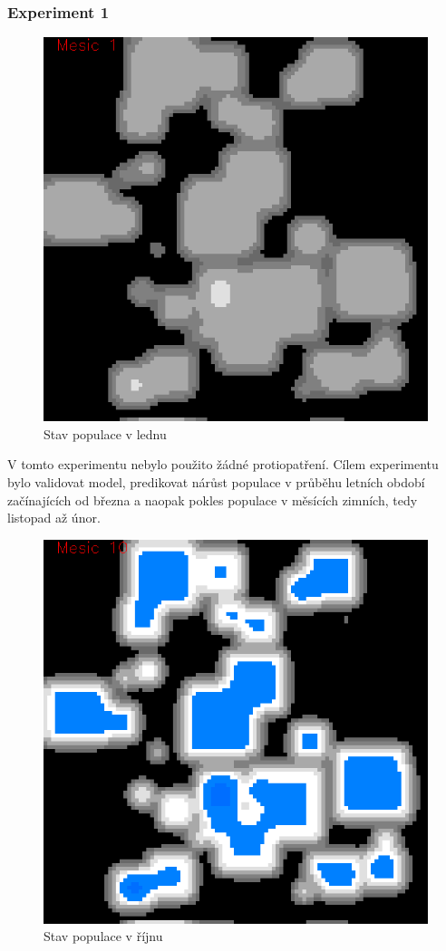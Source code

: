 \documentclass[a4paper,11pt]{article}
\begin{document}
\newpage
\subsubsection{Experiment 1}
\begin{figure}[h]
\begin{center}  
    \includegraphics[width=.4\linewidth]{bez_regul1.png}
    \caption{Stav populace v lednu}
    \label{pic:exp1_obr1}
\end{center}
\end{figure}

V tomto experimentu nebylo použito žádné protiopatření. Cílem experimentu bylo validovat model, predikovat nárůst populace v průběhu letních období začínajících od března a naopak pokles populace v měsících zimních, tedy listopad až únor. 

\begin{figure}[h]
\begin{center}
    \includegraphics[width=.4\linewidth]{bez_regul10.png}
    \caption{Stav populace v říjnu}
    \label{pic:exp1_obr2}
\end{center}
\end{figure}

\newpage
\end{document}
